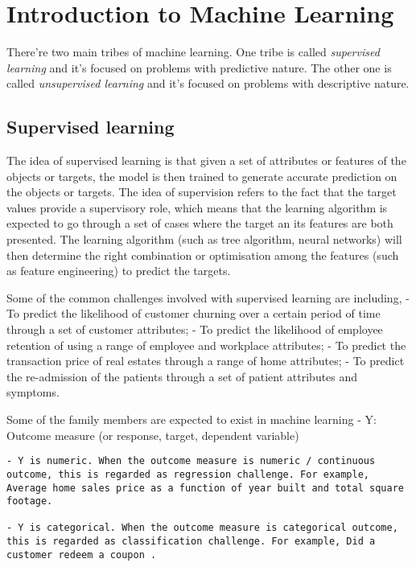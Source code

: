 \documentclass[]{book}
\begin{document}
\hypertarget{introduction-to-machine-learning}{%
\chapter{Introduction to Machine Learning}\label{introduction-to-machine-learning}}

There're two main tribes of machine learning. One tribe is called \emph{supervised learning} and it's focused on problems with predictive nature. The other one is called \emph{unsupervised learning} and it's focused on problems with descriptive nature.

\hypertarget{supervised-learning}{%
\section{Supervised learning}\label{supervised-learning}}

The idea of supervised learning is that given a set of attributes or features of the objects or targets, the model is then trained to generate accurate prediction on the objects or targets. The idea of supervision refers to the fact that the target values provide a supervisory role, which means that the learning algorithm is expected to go through a set of cases where the target an its features are both presented. The learning algorithm (such as tree algorithm, neural networks) will then determine the right combination or optimisation among the features (such as feature engineering) to predict the targets.

Some of the common challenges involved with supervised learning are including,
- To predict the likelihood of customer churning over a certain period of time through a set of customer attributes;
- To predict the likelihood of employee retention of using a range of employee and workplace attributes;
- To predict the transaction price of real estates through a range of home attributes;
- To predict the re-admission of the patients through a set of patient attributes and symptoms.

Some of the family members are expected to exist in machine learning
- Y: Outcome measure (or response, target, dependent variable)

\begin{verbatim}
- Y is numeric. When the outcome measure is numeric / continuous outcome, this is regarded as regression challenge. For example, Average home sales price as a function of year built and total square footage. 

- Y is categorical. When the outcome measure is categorical outcome, this is regarded as classification challenge. For example, Did a customer redeem a coupon . 
\end{verbatim}
\end{document}
